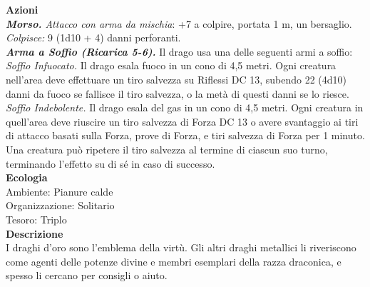 \begin{multicols}{2}
\smallskip\textbf{Azioni}\\
\emph{\textbf{Morso.} Attacco con arma da mischia}: +7 a colpire, portata 1 m, un bersaglio.\\
\emph{Colpisce:} 9 (1d10 + 4) danni perforanti.\\
\emph{\textbf{Arma a Soffio (Ricarica 5-6).}} Il drago usa una delle seguenti armi a soffio:\\
\emph{Soffio Infuocato.} Il drago esala fuoco in un cono di 4,5 metri. Ogni creatura nell'area deve effettuare un tiro salvezza su Riflessi DC 13, subendo 22 (4d10) danni da fuoco se fallisce il tiro salvezza, o la metà di questi danni se lo riesce.\\
\emph{Soffio Indebolente.} Il drago esala del gas in un cono di 4,5 metri. Ogni creatura in quell'area deve riuscire un tiro salvezza di Forza DC 13 o avere svantaggio ai tiri di attacco basati sulla Forza, prove di Forza, e tiri salvezza di Forza per 1 minuto. Una creatura può ripetere il tiro salvezza al termine di ciascun suo turno, terminando l'effetto su di sé in caso di successo.\\
\textbf{Ecologia}\\
Ambiente: Pianure calde\\
Organizzazione: Solitario\\
Tesoro: Triplo\\
\textbf{Descrizione}\\
I draghi d'oro sono l'emblema della virtù. Gli altri draghi metallici li riveriscono come agenti delle potenze divine e membri esemplari della razza draconica, e spesso li cercano per consigli o aiuto.\\


\end{multicols}
